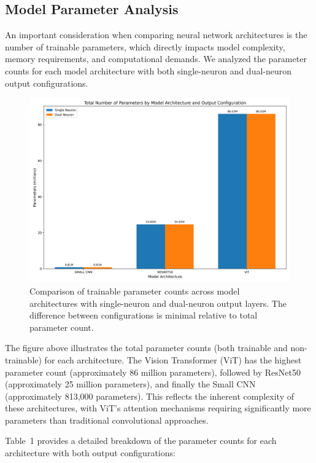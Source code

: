 \subsection{Model Parameter Analysis}

An important consideration when comparing neural network architectures is the number of trainable parameters, which directly impacts model complexity, memory requirements, and computational demands. We analyzed the parameter counts for each model architecture with both single-neuron and dual-neuron output configurations.

\begin{figure}[htbp]
\centering
\includegraphics[width=\textwidth]{figures/parameter_count_comparison.png}
\caption{Comparison of trainable parameter counts across model architectures with single-neuron and dual-neuron output layers. The difference between configurations is minimal relative to total parameter count.}
\end{figure}

The figure above illustrates the total parameter counts (both trainable and non-trainable) for each architecture. The Vision Transformer (ViT) has the highest parameter count (approximately 86 million parameters), followed by ResNet50 (approximately 25 million parameters), and finally the Small CNN (approximately 813,000 parameters). This reflects the inherent complexity of these architectures, with ViT's attention mechanisms requiring significantly more parameters than traditional convolutional approaches.

Table~1 provides a detailed breakdown of the parameter counts for each architecture with both output configurations:

